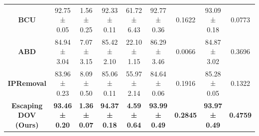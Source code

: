 \begin{table}[htb]
{\begin{tabular}{c|cccccccc}
     \textbf{BCU} & 92.75 ± 0.05 &\cellcolor{lightgreen} 1.56 ± 0.25 & 92.33 ± 0.11 &\cellcolor{lightred} 61.72 ± 6.43 & 92.77 ± 0.36 &\cellcolor{lightgreen} 0.1622  & 93.09 ± 0.18 &\cellcolor{lightgreen} 0.0773  \\
    \textbf{ABD} & 84.94 ± 3.04 &\cellcolor{lightgreen} 7.07 ± 3.15 & 85.42 ± 2.10 &\cellcolor{lightgreen} 22.10 ± 1.15 & 86.29 ± 3.46 &\cellcolor{lightred} 0.0066  & 84.87 ± 3.02 &\cellcolor{lightgreen} 0.3696  \\
     \textbf{IPRemoval} & 83.96 ± 0.23 &\cellcolor{lightgreen} 8.09 ± 0.50 & 85.06 ± 0.11 &\cellcolor{lightred} 55.97 ± 2.14 & 84.64 ± 0.06 &\cellcolor{lightgreen} 0.1916  & 85.28 ± 0.05 & \cellcolor{lightgreen} 0.1322  \\
    \textbf{Escaping DOV (Ours)} & \textbf{93.46 ± 0.20} &\cellcolor{lightgreen} \textbf{1.36 ± 0.07} & \textbf{94.37 ± 0.18} & \cellcolor{lightgreen} \textbf{4.59 ± 0.64} & \textbf{93.99 ± 0.49} &\cellcolor{lightgreen} \textbf{0.2845} & \textbf{93.97 ± 0.49} & \cellcolor{lightgreen} \textbf{0.4759} \\
    \bottomrule[1.5pt]
    \end{tabular}%
    }
  \label{tab:comparison}
\end{table}%

